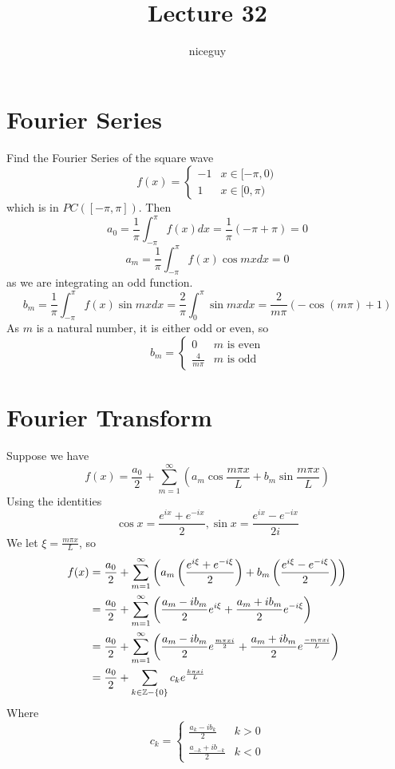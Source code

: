 \documentclass[12pt]{article}
\author{niceguy}
\title{Lecture 32}
\begin{document}
\maketitle

\section{Fourier Series}

\begin{ex}
	Find the Fourier Series of the square wave
	$$f(x) = \begin{cases} -1 & x \in [-\pi,0) \\ 1 & x \in [0,\pi)\end{cases}$$
	which is in $PC([-\pi,\pi])$. Then
	$$a_0 = \frac{1}{\pi}\int_{-\pi}^\pi f(x)dx = \frac{1}{\pi}(-\pi+\pi) = 0$$
	$$a_m = \frac{1}{\pi}\int_{-\pi}^\pi f(x)\cos mxdx = 0$$
	as we are integrating an odd function.
	$$b_m = \frac{1}{\pi}\int_{-\pi}^\pi f(x)\sin mxdx = \frac{2}{\pi}\int_0^\pi\sin mxdx = \frac{2}{m\pi}(-\cos(m\pi)+1)$$
	As $m$ is a natural number, it is either odd or even, so
	$$b_m = \begin{cases} 0 & m \text{ is even} \\ \frac{4}{m\pi} & m \text{ is odd}\end{cases}$$
\end{ex}

\section{Fourier Transform}
Suppose we have
$$f(x) = \frac{a_0}{2} + \sum_{m=1}^\infty\left(a_m\cos\frac{m\pi x}{L} + b_m\sin\frac{m\pi x}{L}\right)$$
Using the identities
$$\cos x = \frac{e^{ix}+e^{-ix}}{2},\sin x = \frac{e^{ix}-e^{-ix}}{2i}$$
We let $\xi = \frac{m\pi x}{L}$, so
\begin{align*}
	f(x) &= \frac{a_0}{2} + \sum_{m=1}^\infty\left(a_m\left(\frac{e^{i\xi}+e^{-i\xi}}{2}\right) + b_m\left(\frac{e^{i\xi}-e^{-i\xi}}{2}\right)\right) \\
	     &= \frac{a_0}{2} + \sum_{m=1}^\infty\left(\frac{a_m-ib_m}{2}e^{i\xi}+\frac{a_m+ib_m}{2}e^{-i\xi}\right) \\
	     &= \frac{a_0}{2} + \sum_{m=1}^\infty\left(\frac{a_m-ib_m}{2}e^{\frac{m\pi xi}{2}} + \frac{a_m+ib_m}{2}e^{\frac{-m\pi xi}{L}}\right) \\
	     &= \frac{a_0}{2} + \sum_{k\in\mathbb{Z} -\{0\}} c_ke^{\frac{k\pi xi}{L}}
\end{align*}
Where
$$c_k = \begin{cases} \frac{a_k-ib_k}{2} & k > 0 \\ \frac{a_{-k} + ib_{-k}}{2} & k < 0\end{cases}$$
\end{document}
